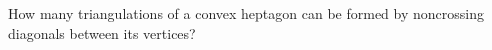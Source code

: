 How many triangulations of a convex heptagon can be formed by noncrossing diagonals between its vertices?
